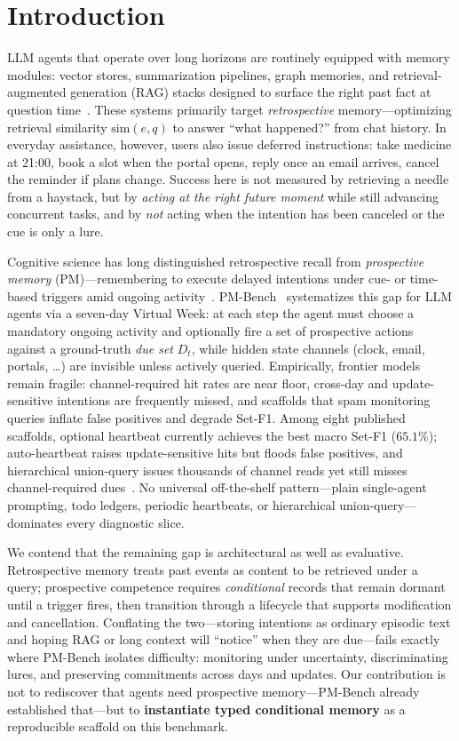 \section{Introduction}
LLM agents that operate over long horizons are routinely equipped with memory modules: vector stores, summarization pipelines, graph memories, and retrieval-augmented generation (RAG) stacks designed to surface the right past fact at question time~\cite{locomo2024,longmemeval2024,amem2025}. These systems primarily target \emph{retrospective} memory---optimizing retrieval similarity $\mathrm{sim}(e,q)$ to answer ``what happened?'' from chat history. In everyday assistance, however, users also issue deferred instructions: take medicine at 21:00, book a slot when the portal opens, reply once an email arrives, cancel the reminder if plans change. Success here is not measured by retrieving a needle from a haystack, but by \emph{acting at the right future moment} while still advancing concurrent tasks, and by \emph{not} acting when the intention has been canceled or the cue is only a lure.

Cognitive science has long distinguished retrospective recall from \emph{prospective memory} (PM)---remembering to execute delayed intentions under cue- or time-based triggers amid ongoing activity~\cite{einstein2005prospective,rendell2000virtual}. PM-Bench~\cite{pmbench2026} systematizes this gap for LLM agents via a seven-day Virtual Week: at each step the agent must choose a mandatory ongoing activity and optionally fire a set of prospective actions against a ground-truth \emph{due set} $D_t$, while hidden state channels (clock, email, portals, \ldots) are invisible unless actively queried. Empirically, frontier models remain fragile: channel-required hit rates are near floor, cross-day and update-sensitive intentions are frequently missed, and scaffolds that spam monitoring queries inflate false positives and degrade Set-F1. Among eight published scaffolds, optional heartbeat currently achieves the best macro Set-F1 ($65.1\%$); auto-heartbeat raises update-sensitive hits but floods false positives, and hierarchical union-query issues thousands of channel reads yet still misses channel-required dues~\cite{pmbench2026}. No universal off-the-shelf pattern---plain single-agent prompting, todo ledgers, periodic heartbeats, or hierarchical union-query---dominates every diagnostic slice.

We contend that the remaining gap is architectural as well as evaluative. Retrospective memory treats past events as content to be retrieved under a query; prospective competence requires \emph{conditional} records that remain dormant until a trigger fires, then transition through a lifecycle that supports modification and cancellation. Conflating the two---storing intentions as ordinary episodic text and hoping RAG or long context will ``notice'' when they are due---fails exactly where PM-Bench isolates difficulty: monitoring under uncertainty, discriminating lures, and preserving commitments across days and updates. Our contribution is not to rediscover that agents need prospective memory---PM-Bench already established that---but to \textbf{instantiate typed conditional memory} as a reproducible scaffold on this benchmark.

